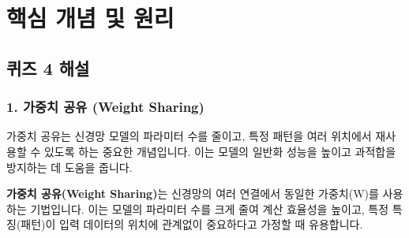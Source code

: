 \documentclass[11pt,a4paper]{article}
\begin{document}
\newpage
\section*{핵심 개념 및 원리}

\subsection*{퀴즈 4 해설}

\subsubsection*{1. 가중치 공유 (Weight Sharing)}
가중치 공유는 신경망 모델의 파라미터 수를 줄이고, 특정 패턴을 여러 위치에서 재사용할 수 있도록 하는 중요한 개념입니다. 이는 모델의 일반화 성능을 높이고 과적합을 방지하는 데 도움을 줍니다.

\begin{tcolorbox}[mybox, title=가중치 공유의 개념]
\textbf{가중치 공유(Weight Sharing)}는 신경망의 여러 연결에서 동일한 가중치(W)를 사용하는 기법입니다.
이는 모델의 파라미터 수를 크게 줄여 계산 효율성을 높이고, 특정 특징(패턴)이 입력 데이터의 위치에 관계없이 중요하다고 가정할 때 유용합니다.
\end{tcolorbox}
\end{document}
